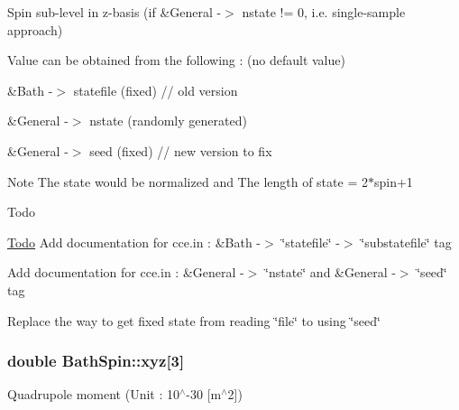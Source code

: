 Spin sub-\/level in z-\/basis (if \&General -\/$>$ nstate != 0, i.\-e. single-\/sample approach) 

Value can be obtained from the following \-: (no default value)
\begin{DoxyItemize}
\item \&Bath -\/$>$ statefile (fixed) // old version
\item \&General -\/$>$ nstate (randomly generated)
\item \&General -\/$>$ seed (fixed) // new version to fix \begin{DoxyNote}{Note}
The state would be normalized and The length of state = 2$\ast$spin+1 
\end{DoxyNote}
\begin{DoxyRefDesc}{Todo}
\item[\hyperlink{todo__todo000005}{Todo}]Add documentation for cce.\-in \-: \&Bath -\/$>$ \char`\"{}statefile\char`\"{} -\/$>$ \char`\"{}substatefile\char`\"{} tag 

Add documentation for cce.\-in \-: \&General -\/$>$ \char`\"{}nstate\char`\"{} and \&General -\/$>$ \char`\"{}seed\char`\"{} tag 

Replace the way to get fixed state from reading \char`\"{}file\char`\"{} to using \char`\"{}seed\char`\"{} \end{DoxyRefDesc}

\end{DoxyItemize}\hypertarget{structBathSpin_ae88f65d01b379916181269efa6c33e8a}{
\subsubsection[{xyz}]{\setlength{\rightskip}{0pt plus 5cm}double Bath\-Spin\-::xyz\mbox{[}3\mbox{]}}}\label{structBathSpin_ae88f65d01b379916181269efa6c33e8a}


Quadrupole moment (Unit \-: 10$^\wedge$-\/30 \mbox{[}m$^\wedge$2\mbox{]}) 

